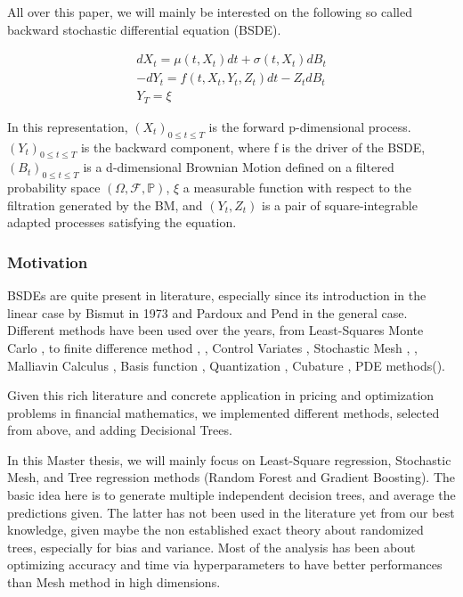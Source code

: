 \documentclass[english,11pt,openany]{article}
\theoremstyle{definition}
\theoremstyle{plain}
\theoremstyle{definition}
\begin{document}
	All over this paper, we will mainly be interested on the following so called backward stochastic differential equation (BSDE). 
	
	\begin{eqnarray}
	dX_t = \mu(t,X_t)dt + \sigma (t, X_t) dB_t\\
	-dY_t = f(t,X_t, Y_t, Z_t)dt - Z_tdB_t \\
	Y_T=\xi
	\end{eqnarray}
	
	In this representation, $(X_t)_{0 \leq t \leq T}$ is the forward p-dimensional process. 
	\newline 
	$(Y_t)_{0 \leq t \leq T}$ is the backward component, where f is the driver of the BSDE, $(B_t)_{0 \leq t \leq T}$ is a d-dimensional Brownian Motion defined on a filtered probability space $(\Omega, \mathcal{F}, \mathbb{P})$, $\xi$ a measurable function with respect to the filtration generated by the BM, and $(Y_t, Z_t)$ is a pair of square-integrable adapted processes satisfying the equation. 
	
	
	\subsubsection{Motivation}
	
	BSDEs are quite present in literature, especially since its introduction in the linear case by Bismut in 1973 \cite{bismut:1973} and Pardoux and Pend \cite{pardoux:1990} in the general case.  
	Different methods have been used over the years, from Least-Squares Monte Carlo \cite{bender:lsmbsde} , to finite difference method \cite{guo:fd}, \cite{milstein:fd}, Control Variates \cite{Gobet:control}, Stochastic Mesh \cite{glasserman:amoption}, \cite{glasserman:broadie}, Malliavin Calculus \cite{Malliavin}, Basis function \cite{Gobet:control}, Quantization \cite{Quantization}, Cubature \cite{Cubature}, PDE methods(\cite{PDE}). 
	
	Given this rich literature and concrete application in pricing and optimization problems in financial mathematics, we implemented different methods, selected from above, and adding Decisional Trees. 
	
	In this Master thesis, we will mainly focus on Least-Square regression, Stochastic Mesh, and Tree regression methods (Random Forest and Gradient Boosting). 
	The basic idea here is to generate multiple independent decision trees, and average the predictions given. The latter has not been used in the literature yet from our best knowledge, given maybe the non established exact theory about randomized trees, especially for bias and variance. 
	Most of the analysis has been about optimizing accuracy and time via hyperparameters to have better performances than Mesh method in high dimensions. 
	
\end{document}
